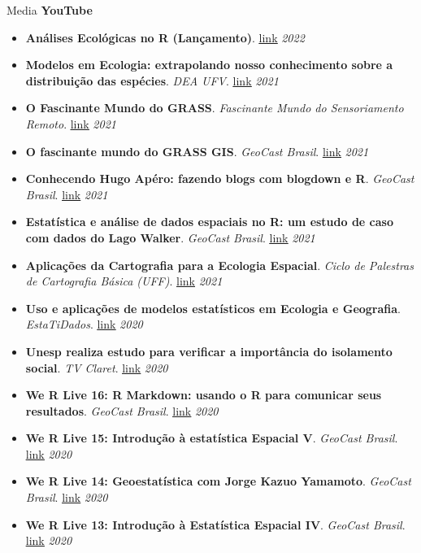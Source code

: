 \documentclass{resume}
\begin{document}
\begin{rSection}{Media}
{\bf YouTube}
\begin{itemize} 
\item {\bf Análises Ecológicas no R (Lançamento)}. \href{https://youtu.be/jYrneB95nes}{\underline{link}} \hfill{\em 2022}
\item {\bf Modelos em Ecologia: extrapolando nosso conhecimento sobre a distribuição das espécies}. {\it DEA UFV}. \href{https://youtu.be/Kcc-eIhqtlE}{\underline{link}} \hfill{\em 2021}
\item {\bf O Fascinante Mundo do GRASS}. {\it Fascinante Mundo do Sensoriamento Remoto}. \href{https://youtu.be/vp6frd89y9E}{\underline{link}} \hfill{\em 2021}
\item {\bf O fascinante mundo do GRASS GIS}. {\it GeoCast Brasil}. \href{https://youtu.be/_pohWjE4eiA}{\underline{link}} \hfill{\em 2021}
\item {\bf Conhecendo Hugo Apéro: fazendo blogs com blogdown e R}. {\it GeoCast Brasil}. \href{https://youtu.be/4Ixl2RjZEYI}{\underline{link}} \hfill{\em 2021}
\item {\bf Estatística e análise de dados espaciais no R: um estudo de caso com dados do Lago Walker}. {\it GeoCast Brasil}. \href{https://youtu.be/csh1BPH_H8I}{\underline{link}} \hfill{\em 2021}
\item {\bf Aplicações da Cartografia para a Ecologia Espacial}. {\it 
Ciclo de Palestras de Cartografia Básica (UFF)}. \href{https://youtu.be/csh1BPH_H8I}{\underline{link}} \hfill{\em 2021}
\item {\bf Uso e aplicações de modelos estatísticos em Ecologia e Geografia}. {\it EstaTiDados}. \href{https://youtu.be/pUavO7dVRGk}{\underline{link}} \hfill{\em 2020}
\item {\bf Unesp realiza estudo para verificar a importância do isolamento social}. {\it 
TV Claret}. \href{https://youtu.be/RP6rUQpberE}{\underline{link}} \hfill{\em 2020}
\item {\bf We R Live 16: R Markdown: usando o R para comunicar seus resultados}. {\it GeoCast Brasil}. \href{https://youtu.be/6oPZ5sGt6LA}{\underline{link}} \hfill{\em 2020}
\item {\bf We R Live 15: Introdução à estatística Espacial V}. {\it GeoCast Brasil}. \href{https://youtu.be/IeGTr7mjZIc}{\underline{link}} \hfill{\em 2020}
\item {\bf We R Live 14: Geoestatística com Jorge Kazuo Yamamoto}. {\it GeoCast Brasil}. \href{https://youtu.be/BvURukaIDM0}{\underline{link}} \hfill{\em 2020}
\item {\bf We R Live 13: Introdução à Estatística Espacial IV}. {\it GeoCast Brasil}. \href{https://youtu.be/IsOJvaWdyXE}{\underline{link}} \hfill{\em 2020}

\end{itemize}
\end{rSection}
\end{document}
